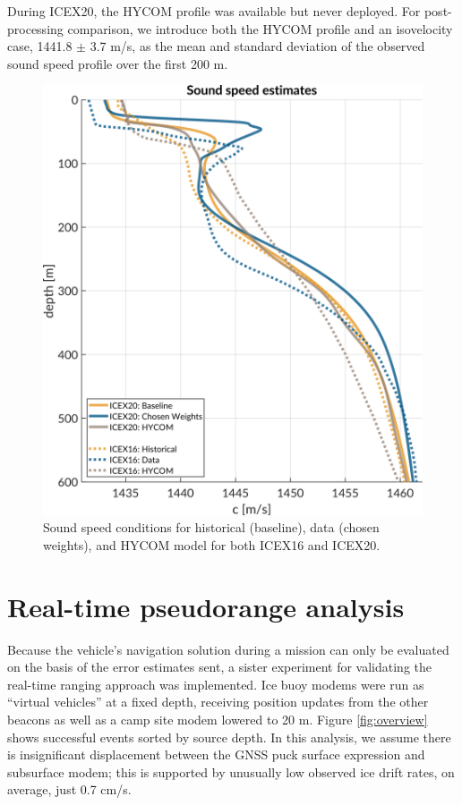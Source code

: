 During ICEX20, the HYCOM profile was available but never deployed. 
For post-processing comparison, we introduce both the HYCOM profile and an isovelocity case, 1441.8 $\pm$ 3.7 m/s, as the mean and standard deviation of the observed sound speed profile over the first 200 m.

\begin{figure}[h!]
	\centering
	\includegraphics[width=\reprintcolumnwidth]{figs/ssp-gvel-icex20-icex16.pdf}
	\caption{Sound speed conditions for historical (baseline), data (chosen weights), and HYCOM model for both ICEX16 and ICEX20.}
	\label{fig:sspExpectation}
\end{figure}

\clearpage
\section{\label{sec:realtime} Real-time pseudorange analysis}

Because the vehicle's navigation solution during a mission can only be evaluated on the basis of the error estimates sent, a sister experiment for validating the real-time ranging approach was implemented.
Ice buoy modems were run as ``virtual vehicles'' at a fixed depth, receiving position updates from the other beacons as well as a camp site modem lowered to 20 m. 
Figure \ref{fig:overview} shows successful events sorted by source depth.
In this analysis, we assume there is insignificant displacement between the GNSS puck surface expression and subsurface modem; this is supported by unusually low observed ice drift rates, on average, just 0.7 cm/s.


